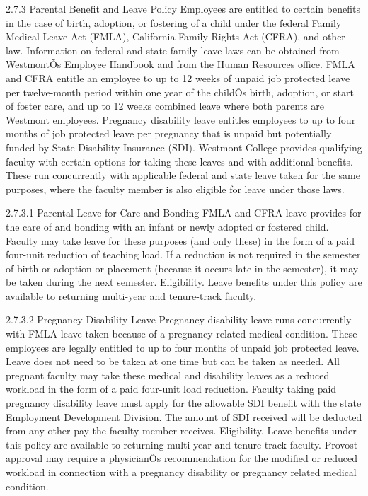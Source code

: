 \documentclass[letterpaper, 11pt]{article}
\begin{document}
	2.7.3 Parental Benefit and Leave Policy
	Employees are entitled to certain benefits in the case of birth, adoption, or fostering of a child under the federal Family Medical Leave Act (FMLA), California Family Rights Act (CFRA), and other law. Information on federal and state family leave laws can be obtained from WestmontÕs Employee Handbook and from the Human Resources office. FMLA and CFRA entitle an employee to up to 12 weeks of unpaid job protected leave per twelve-month period within one year of the childÕs birth, adoption, or start of foster care, and up to 12 weeks combined leave where both parents are Westmont employees. Pregnancy disability leave entitles employees to up to four months of job protected leave per pregnancy that is unpaid but potentially funded by State Disability Insurance (SDI).
	Westmont College provides qualifying faculty with certain options for taking these leaves and with additional benefits. These run concurrently with applicable federal and state leave taken for the same purposes, where the faculty member is also eligible for leave under those laws.

	2.7.3.1 Parental Leave for Care and Bonding
	FMLA and CFRA leave provides for the care of and bonding with an infant or newly adopted or fostered child. Faculty may take leave for these purposes (and only these) in the form of a paid four-unit reduction of teaching load. If a reduction is not required in the semester of birth or adoption or placement (because it occurs late in the semester), it may be taken during the next semester.
	Eligibility. Leave benefits under this policy are available to returning multi-year and tenure-track faculty.

	2.7.3.2 Pregnancy Disability Leave
	Pregnancy disability leave runs concurrently with FMLA leave taken because of a pregnancy-related medical condition. These employees are legally entitled to up to four months of unpaid job protected leave. Leave does not need to be taken at one time but can be taken as needed.
	All pregnant faculty may take these medical and disability leaves as a reduced workload in the form of a paid four-unit load reduction. Faculty taking paid pregnancy disability leave must apply for the allowable SDI benefit with the state Employment Development Division. The amount of SDI received will be deducted from any other pay the faculty member receives.
	Eligibility. Leave benefits under this policy are available to returning multi-year and tenure-track faculty. Provost approval may require a physicianÕs recommendation for the modified or reduced workload in connection with a pregnancy disability or pregnancy related medical condition.
\end{document}
